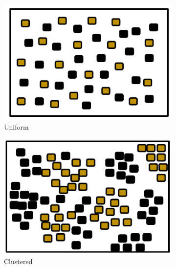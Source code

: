 \vspace{-2em}
\begin{figure} [h]
        \centering
        \begin{subfigure}[b]{0.21\textwidth}
                \includegraphics[width=\textwidth]{chapters/chapter4/figures/uniformenv.pdf}
                \caption{Uniform}
                \label{fig:uniformenv}
        \end{subfigure}%
        \begin{subfigure}[b]{0.205\textwidth}
                \includegraphics[width=\textwidth]{chapters/chapter4/figures/clusterenv.pdf}
                \caption{Clustered}
                \label{fig:clusterenv}
        \end{subfigure}
        \begin{subfigure}[b]{0.2\textwidth}

\end{subfigure}
\end{figure}
